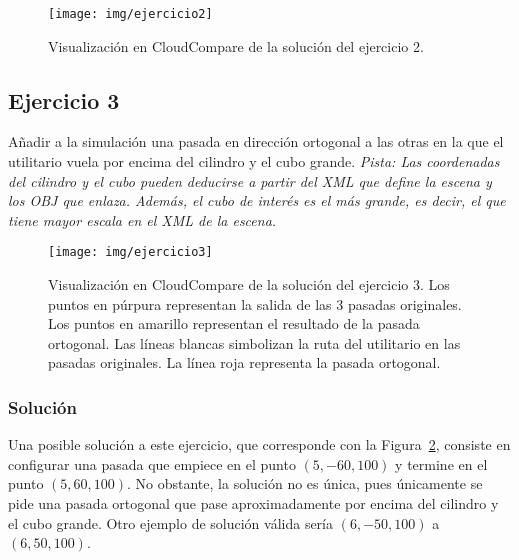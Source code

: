 \documentclass[]{article}
\begin{document}
	\begin{figure}[htb]
		\centering
		\texttt{[image: img/ejercicio2]}
		\caption{Visualización en CloudCompare de la solución del ejercicio 2.}
		\label{fig:ejercicio2}
	\end{figure} 

	
	\pagebreak


	\subsection*{Ejercicio 3}
	Añadir a la simulación una pasada en dirección ortogonal a las otras en la que el utilitario vuela por encima del cilindro y el cubo grande. \textit{Pista: Las coordenadas del cilindro y el cubo pueden deducirse a partir del XML que define la escena y los OBJ que enlaza. Además, el cubo de interés es el más grande, es decir, el que tiene mayor escala en el XML de la escena.}
	
	\begin{figure}[htb]
		\centering
		\texttt{[image: img/ejercicio3]}
		\caption{Visualización en CloudCompare de la solución del ejercicio 3. Los puntos en púrpura representan la salida de las 3 pasadas originales. Los puntos en amarillo representan el resultado de la pasada ortogonal. Las líneas blancas simbolizan la ruta del utilitario en las pasadas originales. La línea roja representa la pasada ortogonal.}
		\label{fig:ejercicio3}
	\end{figure} 

	\subsubsection*{Solución}
	Una posible solución a este ejercicio, que corresponde con la Figura~\ref{fig:ejercicio3}, consiste en configurar una pasada que empiece en el punto $(5, -60, 100)$ y termine en el punto $(5, 60, 100)$. No obstante, la solución no es única, pues únicamente se pide una pasada ortogonal que pase aproximadamente por encima del cilindro y el cubo grande. Otro ejemplo de solución válida sería $(6, -50, 100)$ a $(6, 50, 100)$. 
\end{document}
